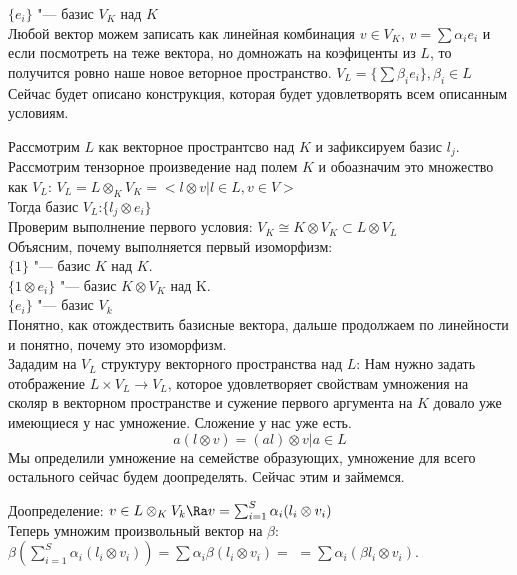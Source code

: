 \begin{description}
$\{e_i\}$ "--- базис $V_K$ над $K$\\
Любой вектор можем записать как линейная комбинация $v \in V_K$, 
$v = \sum \alpha_i e_i$ и если посмотреть на теже вектора, но домножать на 
коэфиценты из $L$, то получится ровно наше новое веторное пространство. 
$V_L  = \{\sum \beta_ie_i\}, \beta_i \in L$\\

Сейчас будет описано конструкция, которая будет удовлетворять всем 
описанным условиям.

Рассмотрим $L$ как векторное пространтсво над $K$ и зафиксируем базис $l_j$.\\

Рассмотрим тензорное произведение над полем $K$ и обоазначим это множество как $V_L$:
$V_L = L \otimes_{K} V_K = < l \otimes v | l \in L, v \in V >$\\

Тогда базис $V_L$:$\{l_j \otimes e_i\}$\\

Проверим выполнение первого условия: $V_K \cong K \otimes V_K \subset L \otimes V_L$\\
Объясним, почему выполняется первый изоморфизм:\\
$\{1\}$ "--- базис $K$ над $K$.\\
$\{1 \otimes e_i\}$ "--- базис $K \otimes V_K$ над K.\\
$\{e_i\}$ "--- базис $V_k$\\
Понятно, как отождествить базисные вектора, дальше продолжаем по линейности и понятно, почему это 
изоморфизм.\\

Зададим на $V_L$ структуру векторного пространства над $L$:
Нам нужно задать отображение $L \times V_L \to V_L$, которое удовлетворяет свойствам умножения на сколяр в 
векторном пространстве и сужение первого аргумента на $K$ довало уже имеющиеся у нас умножение. Сложение у нас уже есть.
$$a(l \otimes v) = (al) \otimes v | a \in L $$
Мы определили умножение на семействе образующих, умножение для всего остального сейчас будем доопределять.
Сейчас этим и займемся.

Доопределение:
$v \in L \otimes_K V_k \Ra v = \sum_{i = 1}^{S}\alpha_i (l_i \otimes v_i)$\\
Теперь умножим произвольный вектор на $\beta:$\\
$\beta (\sum_{i = 1}^{S}\alpha_i(l_i \otimes v_i)) = \sum \alpha_i \beta(l_i \otimes v_i) = $
$= \sum \alpha_i(\beta l_i \otimes v_i)$.


\end{description}
